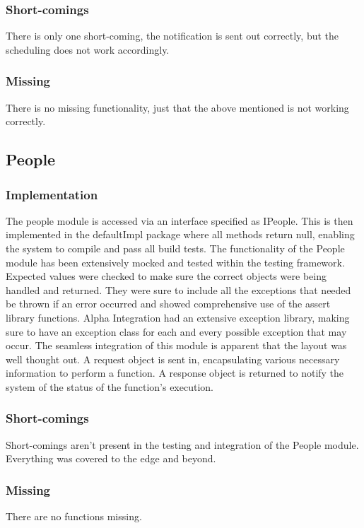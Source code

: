 \documentclass{article}
\begin{document}
        \subsubsection{Short-comings}
        There is only one short-coming, the notification is sent out correctly, but the scheduling does not work accordingly. 
        \subsubsection{Missing}
        There is no missing functionality, just that the above mentioned is not working correctly.

    \subsection{People}
        \subsubsection{Implementation}
		The people module is accessed via an interface specified as IPeople. This is then implemented in the defaultImpl package where all methods return null, enabling the system to compile and pass all build tests. The functionality of the People module has been extensively mocked and tested within the testing framework. Expected values were checked to make sure the correct objects were being handled and returned. They were sure to include all the exceptions that needed be thrown if an error occurred and showed comprehensive use of the assert library functions. Alpha Integration had an extensive exception library, making sure to have an exception class for each and every possible exception that may occur. The seamless integration of this module is apparent that the layout was well thought out. A request object is sent in, encapsulating various necessary information to perform a function. A response object is returned to notify the system of the status of the function's execution.
		\subsubsection{Short-comings}
		Short-comings aren't present in the testing and integration of the People module. Everything was covered to the edge and beyond.
		\subsubsection{Missing}
		There are no functions missing.
		
\end{document}
